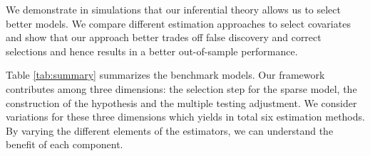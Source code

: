 \documentclass[11pt]{article}
\begin{document}
	
	
	
	
	
	
	
	We demonstrate in simulations that our inferential theory allows us to select better models. We compare different estimation approaches to select covariates and show that our approach better trades off false discovery and correct selections and hence results in a better out-of-sample performance.
	
	Table \ref{tab:summary} summarizes the benchmark models. Our framework contributes among three dimensions: the selection step for the sparse model, the construction of the hypothesis and the multiple testing adjustment. We consider variations for these three dimensions which yields in total six estimation methods. By varying the different elements of the estimators, we can understand the benefit of each component.
	
	
	
\end{document}
